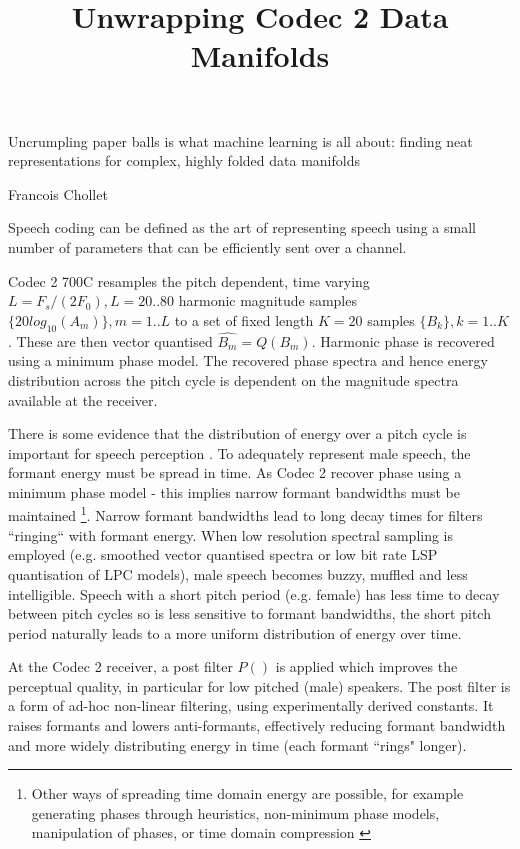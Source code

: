 \documentclass{article}
\begin{document}
\title{Unwrapping Codec 2 Data Manifolds}
\maketitle

\epigraph{Uncrumpling paper balls is what machine learning is all about: finding neat representations for complex, highly folded data manifolds}{Francois Chollet \cite{chollet2018deep}}

Speech coding can be defined as the art of representing speech using a small number of parameters that can be efficiently sent over a channel.

Codec 2 700C resamples the pitch dependent, time varying $L=F_s/(2F_0), L=20..80$ harmonic magnitude samples $\{20log_{10}(A_m)\}, m=1..L$ to a set of fixed length $K=20$ samples $\{B_k\},k=1..K$.  These are then vector quantised $\hat{B_m}=Q(B_m)$.  Harmonic phase is recovered using a minimum phase model. The recovered phase spectra and hence energy distribution across the pitch cycle is dependent on the magnitude spectra available at the receiver.

There is some evidence that the distribution of energy over a pitch cycle is important for speech perception \cite{rowe2023_ratek_study}. To adequately represent male speech, the formant energy must be spread in time.  As Codec 2 recover phase using a minimum phase model - this implies narrow formant bandwidths must be maintained \footnote{Other ways of spreading time domain energy are possible, for example generating phases through heuristics, non-minimum phase models, manipulation of phases, or time domain compression \cite{rowe2023_ratek_study}}.  Narrow formant bandwidths lead to long decay times for filters ``ringing`` with formant energy. When low resolution spectral sampling is employed (e.g. smoothed vector quantised spectra or low bit rate LSP quantisation of LPC models), male speech becomes buzzy, muffled and less intelligible.  Speech with a short pitch period (e.g. female) has less time to decay between pitch cycles so is less sensitive to formant bandwidths, the short pitch period naturally leads to a more uniform distribution of energy over time.

At the Codec 2 receiver, a post filter $P()$ is applied which improves the perceptual quality, in particular for low pitched (male) speakers. The post filter is a form of ad-hoc non-linear filtering, using experimentally derived constants.  It raises formants and lowers anti-formants, effectively reducing formant bandwidth and more widely distributing energy in time (each formant ``rings" longer).
\end{document}
